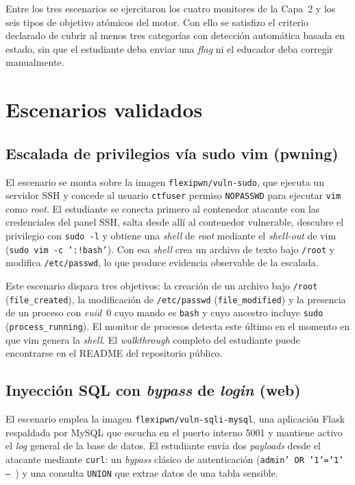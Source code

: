 Entre los tres escenarios se ejercitaron los cuatro monitores de la Capa~2 y
los seis tipos de objetivo atómicos del motor. Con ello se satisfizo el criterio 
declarado de cubrir al menos tres categorías con detección automática basada en estado, 
sin que el estudiante deba enviar una \textit{flag} ni el educador deba corregir
manualmente.

\section{Escenarios validados}

\subsection{Escalada de privilegios vía sudo vim (pwning)}

El escenario se monta sobre la imagen \texttt{flexipwn/vuln-sudo}, que ejecuta
un servidor SSH y concede al usuario \texttt{ctfuser} permiso \texttt{NOPASSWD}
para ejecutar \texttt{vim} como \textit{root}. El estudiante se conecta primero
al contenedor atacante con las credenciales del panel SSH, salta desde allí al
contenedor vulnerable, descubre el privilegio con \texttt{sudo -l} y obtiene una
\textit{shell} de \textit{root} mediante el \textit{shell-out} de vim
(\texttt{sudo vim -c ':!bash'}). Con esa \textit{shell} crea un archivo de texto
bajo \texttt{/root} y modifica \texttt{/etc/passwd}, lo que produce evidencia
observable de la escalada.

Este escenario dispara tres objetivos: la creación de un archivo bajo
\texttt{/root} (\texttt{file\_created}), la modificación de \texttt{/etc/passwd}
(\texttt{file\_modified}) y la presencia de un proceso con \textit{euid}~0 cuyo
mando es \texttt{bash} y cuyo ancestro incluye \texttt{sudo}
(\texttt{process\_running}). El monitor de procesos detecta este último en el
momento en que vim genera la \textit{shell}. El \textit{walkthrough} completo
del estudiante puede encontrarse en el README del repositorio público.

\subsection{Inyección SQL con \textit{bypass} de \textit{login} (web)}

El escenario emplea la imagen \texttt{flexipwn/vuln-sqli-mysql}, una aplicación
Flask respaldada por MySQL que escucha en el puerto interno 5001 y mantiene
activo el \textit{log} general de la base de datos. El estudiante envía dos
\textit{payloads} desde el atacante mediante \texttt{curl}: un \textit{bypass}
clásico de autenticación (\texttt{admin' OR '1'='1' -- }) y una consulta
\texttt{UNION} que extrae datos de una tabla sensible.

